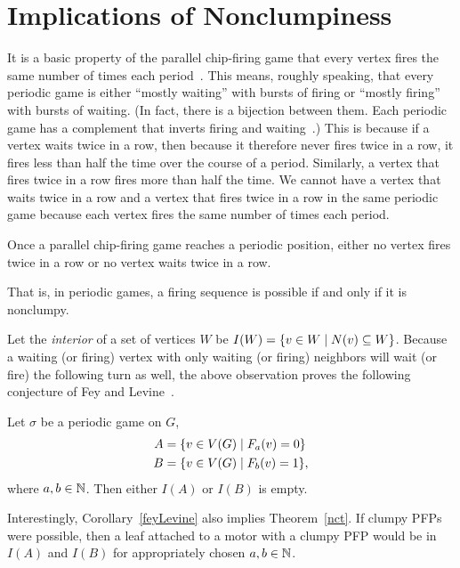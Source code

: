 \section{Implications of Nonclumpiness} \label{corollaries}
It is a basic property of the parallel chip-firing game that every vertex fires
the same number of times each period~\cite{jiang}. This means, roughly
speaking, that every periodic game is either ``mostly waiting'' with bursts of
firing or ``mostly firing'' with bursts of waiting. (In fact, there is a
bijection between them. Each periodic game has a complement that inverts firing
and waiting~\cite{jiang}.) This is because if a vertex waits twice in a row,
then because it therefore never fires twice in a row, it fires less than half
the time over the course of a period. Similarly, a vertex that fires twice in a
row fires more than half the time. We cannot have a vertex that waits twice
in a row and a vertex that fires twice in a row in the same periodic game
because each vertex fires the same number of times each period.

\begin{cor}
Once a parallel chip-firing game reaches a periodic position, either no vertex
fires twice in a row or no vertex waits twice in a row.
\end{cor}

That is, in periodic games, a firing sequence is possible if and only if it is
nonclumpy.

Let the \emph{interior} of a set of vertices $W$ be $I(W) = \set{v \in W}{N(v)
  \subseteq W}$. Because a waiting (or firing) vertex with only waiting (or
firing) neighbors will wait (or fire) the following turn as well, the above
observation proves the following conjecture of Fey and
Levine~\cite{privateComms}.

\begin{cor}\label{feyLevine}
Let $\sigma$ be a periodic game on $G$,
\begin{align*}
  A &= \set{v \in \V}{\firing{v}{a} = 0} \\
  B &= \set{v \in \V}{\firing{v}{b} = 1},
\end{align*}
where $a,b \in \mathbb{N}$. Then either $I(A)$ or $I(B)$ is empty.
\end{cor}

Interestingly, Corollary~\ref{feyLevine} also implies Theorem~\ref{nct}. If
clumpy PFPs were possible, then a leaf attached to a motor with a clumpy PFP
would be in $I(A)$ and $I(B)$ for appropriately chosen $a,b \in \mathbb{N}$.

